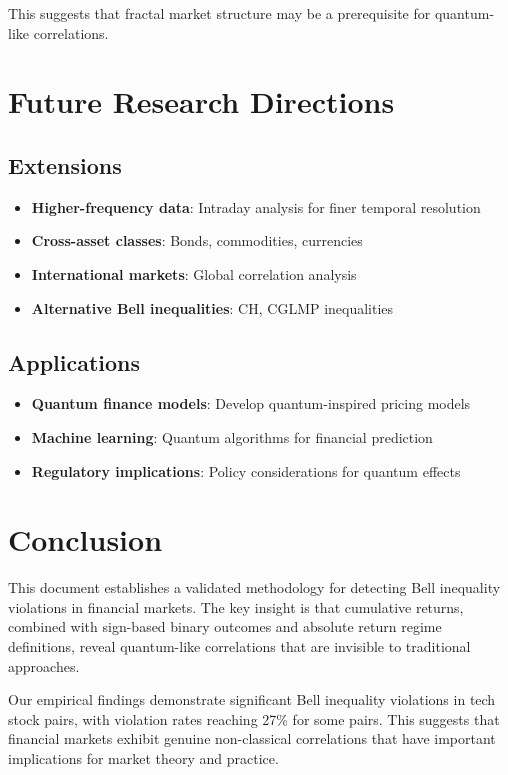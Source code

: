 \documentclass[11pt,a4paper]{article}
\begin{document}
This suggests that fractal market structure may be a prerequisite for quantum-like correlations.

\section{Future Research Directions}

\subsection{Extensions}

\begin{itemize}
    \item \textbf{Higher-frequency data}: Intraday analysis for finer temporal resolution
    \item \textbf{Cross-asset classes}: Bonds, commodities, currencies
    \item \textbf{International markets}: Global correlation analysis
    \item \textbf{Alternative Bell inequalities}: CH, CGLMP inequalities
\end{itemize}

\subsection{Applications}

\begin{itemize}
    \item \textbf{Quantum finance models}: Develop quantum-inspired pricing models
    \item \textbf{Machine learning}: Quantum algorithms for financial prediction
    \item \textbf{Regulatory implications}: Policy considerations for quantum effects
\end{itemize}

\section{Conclusion}

This document establishes a validated methodology for detecting Bell inequality violations in financial markets. The key insight is that cumulative returns, combined with sign-based binary outcomes and absolute return regime definitions, reveal quantum-like correlations that are invisible to traditional approaches.

Our empirical findings demonstrate significant Bell inequality violations in tech stock pairs, with violation rates reaching 27\% for some pairs. This suggests that financial markets exhibit genuine non-classical correlations that have important implications for market theory and practice.
\end{document}
